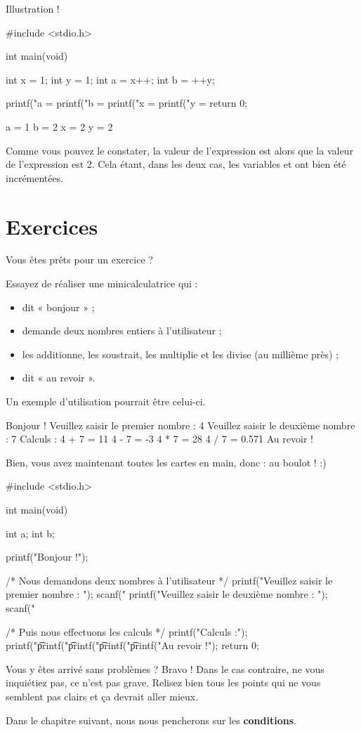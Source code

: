 Illustration !

\begin{C}
 #include <stdio.h>

int main(void)
{
    int x = 1;
    int y = 1;
    int a = x++;
    int b = ++y;

    printf("a = %
    printf("b = %
    printf("x = %
    printf("y = %
    return 0;
}
\end{C}

\begin{C}
a = 1
b = 2
x = 2
y = 2
\end{C}

Comme vous pouvez le constater, la valeur de l'expression 
est  alors que la valeur de l'expression  est 2.
Cela étant, dans les deux cas, les variables  et 
ont bien été incrémentées.

\section{Exercices}
\label{exercices-1}

Vous êtes prêts pour un exercice ?

Essayez de réaliser une minicalculatrice qui :

\begin{itemize}
\item
  dit « bonjour » ;
\item
  demande deux nombres entiers à l'utilisateur ;
\item
  les additionne, les soustrait, les multiplie et les divise (au
  millième près) ;
\item
  dit « au revoir ».
\end{itemize}

Un exemple d'utilisation pourrait être celui-ci.

\begin{C}
Bonjour !
Veuillez saisir le premier nombre : 4
Veuillez saisir le deuxième nombre : 7
Calculs :
        4 + 7 = 11
        4 - 7 = -3
        4 * 7 = 28
        4 / 7 = 0.571
Au revoir !
\end{C}

Bien, vous avez maintenant toutes les cartes en main, donc : au boulot !
:)

\begin{C}
#include <stdio.h>


int main(void)
{
   int a;
   int b;

   printf("Bonjour !\n");

   /* Nous demandons deux nombres à l'utilisateur */
   printf("Veuillez saisir le premier nombre : ");
   scanf("%
   printf("Veuillez saisir le deuxième nombre : ");
   scanf("%

   /* Puis nous effectuons les calculs */
   printf("Calculs :\n");
   printf("\t%
   printf("\t%
   printf("\t%
   printf("\t%
   printf("Au revoir !\n");
   return 0; 
}
\end{C}

Vous y êtes arrivé sans problèmes ? Bravo ! Dans le cas contraire, ne
vous inquiétiez pas, ce n'est pas grave. Relisez bien tous les points
qui ne vous semblent pas clairs et ça devrait aller mieux.

\hrulefill

Dans le chapitre suivant, nous nous pencherons sur les \textbf{conditions}.
